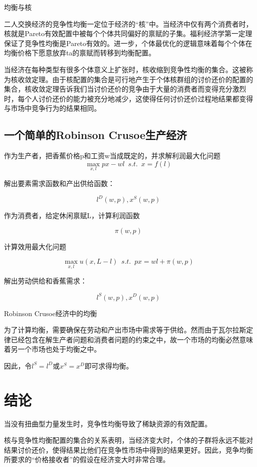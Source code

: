 \documentclass{article}
\begin{document}
\hspace*{\fill}

均衡与核

二人交换经济的竞争性均衡一定位于经济的“核”中。当经济中仅有两个消费者时，核就是Pareto有效配置中被每个个体共同偏好的禀赋的子集。福利经济学第一定理保证了竞争性均衡是Pareto有效的。进一步，个体最优化的逻辑意味着每个个体在均衡价格下愿意放弃ta的禀赋而转移到均衡配置。

当经济在每种类型有很多个体意义上扩张时，核收缩到竞争性均衡的集合。这被称为核收敛定理。由于核配置的集合是可行地产生于个体核群组的讨价还价的配置的集合，核收敛定理告诉我们当讨价还价的竞争由于大量的消费者而变得充分激烈时，每个人讨价还价的能力被充分地减少，这使得任何讨价还价过程地结果都变得与市场中竞争行为的结果相同。

\subsection{一个简单的Robinson Crusoe生产经济}

作为生产者，把香蕉价格p和工资w当成既定的，并求解利润最大化问题
\[
\max\limits_{x,l} px-wl\enspace s.t.\enspace x=f(l)
\]

解出要素需求函数和产出供给函数：

\[
l^D(w,p),x^S(w,p)
\]

作为消费者，给定休闲禀赋L，计算利润函数

\[
\pi(w,p)
\]

计算效用最大化问题

\[
\max\limits_{x,l}u(x,L-l)\enspace s.t.\enspace px=wl+\pi(w,p)
\]

解出劳动供给和香蕉需求：

\[
l^S(w,p),x^D(w,p)
\]

\hspace*{\fill}

Robinson Crusoe经济中的均衡

为了计算均衡，需要确保在劳动和产出市场中需求等于供给。然而由于瓦尔拉斯定律已经包含在解生产者问题和消费者问题的约束之中，故一个市场的均衡必然意味着另一个市场也处于均衡之中。

因此，令$ l^S=l^D $或$ x^S=x^D $即可求得均衡。

\section{结论}

当没有扭曲型力量发生时，竞争性均衡导致了稀缺资源的有效配置。

核与竞争性均衡配置的集合的关系表明，当经济变大时，个体的子群将永远不能对结果讨价还价，使得结果比他们在竞争性市场中得到的结果更好。因此，竞争均衡所要求的“价格接收者”的假设在经济变大时非常合理。
\end{document}
